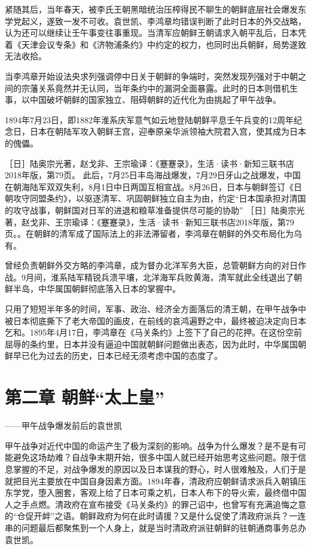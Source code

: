 \documentclass[12pt,UTF8]{ctexbook}
\begin{document}
紧随其后，当年春天，被李氏王朝黑暗统治压榨得民不聊生的朝鲜底层社会爆发东学党起义，遂致一发不可收。袁世凯、李鸿章均错误判断了此时日本的外交战略，认为还可以继续让壬午事变往事重现。当清军应朝鲜王朝请求入朝平乱后，日本凭着《天津会议专条》和《济物浦条约》中约定的权力，也同时出兵朝鲜，局势遂致无法收拾。

当李鸿章开始设法央求列强调停中日关于朝鲜的争端时，突然发现列强对于中朝之间的宗藩关系竟然并无认同，当年条约中的漏洞全面暴露。此时的日本则借机生事，以中国破坏朝鲜的国家独立、阻碍朝鲜的近代化为由挑起了甲午战争。

1894年7月23日，即1882年淮系庆军意气如云地登陆朝鲜平息壬午兵变的12周年纪念日，日本在朝陆军攻入朝鲜王宫，迎奉原亲华派领袖大院君入宫，使其成为日本的傀儡。

［日］陆奥宗光著，赵戈非、王宗瑜译：《蹇蹇录》，生活·读书·新知三联书店2018年版，第79页。
此后，7月25日丰岛海战爆发，7月29日牙山之战爆发，中国在朝海陆军双双失利，8月1日中日两国互相宣战。8月26日，日本与朝鲜签订《日朝攻守同盟条约》，以驱逐清军、巩固朝鲜独立自主为由，约定“日本国承担对清国的攻守战事，朝鲜国对日军的进退和粮草准备提供尽可能的协助” ［日］陆奥宗光著，赵戈非、王宗瑜译：《蹇蹇录》，生活·读书·新知三联书店2018年版，第79页。。在朝鲜的清军成了国际法上的非法滞留者，李鸿章在朝鲜的外交布局化为乌有。

曾经负责朝鲜外交方略的李鸿章，成为督办北洋军务大臣，总管朝鲜方向的对日作战。9月间，淮系陆军精锐兵溃平壤，北洋海军兵败黄海，清军就此全线退出了朝鲜半岛，中华属国朝鲜彻底落入日本的掌握中。

只用了短短半年多的时间，军事、政治、经济全方面落后的清王朝，在甲午战争中被日本彻底撕下了老大帝国的画皮，在前线的哀鸿遍野之中，最终被迫决定向日本乞和。1895年4月17日，李鸿章在《马关条约》上签下了自己的花押。在这份空前屈辱的条约里，日本并没有逼迫中国就朝鲜问题做出表态，因为此时，中华属国朝鲜早已化为过去的历史，日本已经无须考虑中国的态度了。

\chapter{第二章 朝鲜“太上皇”}

——甲午战争爆发前后的袁世凯

甲午战争对近代中国的命运产生了极为深刻的影响。战争为什么爆发？是不是有可能避免这场劫难？自战争末期开始，很多中国人就已经开始思考这些问题。限于信息掌握的不足，对战争爆发的原因以及日本谋我的野心，时人很难触及，人们于是就把目光主要放在中国自身因素方面。1894年春，清政府应朝鲜请求派兵入朝镇压东学党，堕入圈套，客观上给了日本可乘之机，日本人布下的导火索，最终借中国人之手点燃。清政府在宣布接受《马关条约》的罪己诏中，也曾写有充满追悔之意的“仓促开衅”之语。朝鲜政府为何在此时请援？又是什么促使了清政府派兵？一连串的问题最后都聚焦到一个人身上，就是当时清政府派驻朝鲜的驻朝通商事务总办袁世凯。
\end{document}
